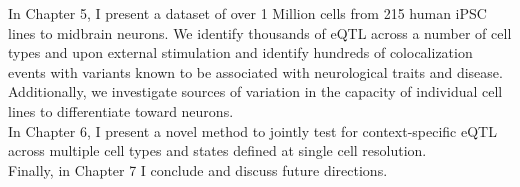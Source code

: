 In Chapter 5, I present a dataset of over 1 Million cells from 215 human iPSC lines to midbrain neurons.
We identify thousands of eQTL across a number of cell types and upon external stimulation and identify hundreds of colocalization events with variants known to be associated with neurological traits and disease.
Additionally, we investigate sources of variation in the capacity of individual cell lines to differentiate toward neurons.\\

In Chapter 6, I present a novel method to jointly test for context-specific eQTL across multiple cell types and states defined at single cell resolution. \\

Finally, in Chapter 7 I conclude and discuss future directions.